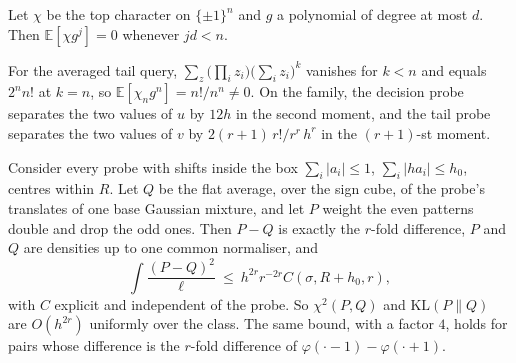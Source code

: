 \begin{theorem}
\label{thm:vanish}
Let $\chi$ be the top character on $\{\pm1\}^{n}$ and $g$ a polynomial of degree at most $d$.
Then $\mathbb{E}[\chi g^{j}]=0$ whenever $jd<n$.
\end{theorem}


\begin{theorem}[Attainment]
\label{thm:attain}
For the averaged tail query, $\sum_{z}\bigl(\prod_{i}z_{i}\bigr)\bigl(\sum_{i}z_{i}\bigr)^{k}$
vanishes for $k<n$ and equals $2^{n}n!$ at $k=n$, so $\mathbb{E}[\chi_{n}g^{n}]=n!/n^{n}\ne0$. On
the family, the decision probe separates the two values of $u$ by $12h$ in the second moment,
and the tail probe separates the two values of $v$ by $2(r+1)\,r!/r^{r}\,h^{r}$ in the
$(r+1)$-st moment.
\end{theorem}


\begin{theorem}
\label{thm:unif}
Consider every probe with shifts inside the box $\sum_{i}|a_{i}|\le1$, $\sum_{i}|ha_{i}|\le h_{0}$,
centres within $R$. Let $Q$ be the flat average, over the sign cube, of the probe's translates
of one base Gaussian mixture, and let $P$ weight the even patterns double and drop the odd
ones. Then $P-Q$ is exactly the $r$-fold difference, $P$ and $Q$ are densities up to one common
normaliser, and
\[
\int\frac{(P-Q)^{2}}{\ell}\ \le\ h^{2r}r^{-2r}C(\sigma,R+h_{0},r),
\]
with $C$ explicit and independent of the probe. So $\chi^{2}(P,Q)$ and $\mathrm{KL}(P\|Q)$ are
$O(h^{2r})$ uniformly over the class. The same bound, with a factor $4$, holds for pairs whose
difference is the $r$-fold difference of $\varphi(\cdot-1)-\varphi(\cdot+1)$.
\end{theorem}


